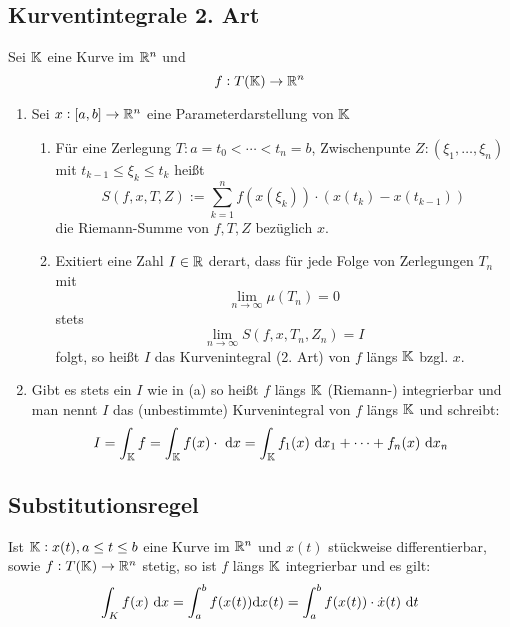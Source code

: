 \subsection{Kurventintegrale 2. Art}
Sei $\mathbb{K}$ eine Kurve im $\mathbb{R}^n$ und
\begin{equation*}
    f: T(\mathbb{K}) \rightarrow \mathbb{R}^n
\end{equation*}
\begin{enumerate}[label= (\alph*)]
    \item Sei $x: [a,b]  \rightarrow \mathbb{R}^n$ eine Parameterdarstellung von $\mathbb{K}$
        \begin{enumerate}[label = (\roman*)]
            \item Für eine Zerlegung $T: a = t_0 < \cdots < t_n = b$,
                Zwischenpunte $Z: (\xi_1, \ldots, \xi_n)$ mit
                $t_{k-1} \leq \xi_k \leq t_k$
                heißt
                \begin{equation*}
                    S(f,x,T,Z) := \sum_{k=1}^n f(x(\xi_k)) \cdot (x(t_k) - x(t_{k-1}))
                \end{equation*}
                die Riemann-Summe von $f, T, Z$ bezüglich $x$.
            \item Exitiert eine Zahl $I \in \mathbb{R}$ derart, dass für jede Folge von
                Zerlegungen $T_n$ mit
                \begin{equation*}
                    \lim_{n \rightarrow \infty} \mu(T_n) = 0
                \end{equation*}
                stets
                \begin{equation*}
                    \lim_{n \rightarrow \infty} S(f,x,T_n, Z_n) = I
                \end{equation*}
                folgt, so heißt $I$ das Kurvenintegral (2. Art) von
                $f$ längs $\mathbb{K}$ bzgl. $x$.
        \end{enumerate}
    \item Gibt es stets ein $I$ wie in (a) so heißt $f$ längs $\mathbb{K}$ (Riemann-)
        integrierbar und man nennt $I$ das (unbestimmte) Kurvenintegral von $f$
        längs $\mathbb{K}$ und schreibt:
        \begin{equation*}
            I = \int_{\mathbb{K}} f = \int_{\mathbb{K}} f(x) \cdot \text{ d}x = \int_{\mathbb{K}} f_1(x) \text{ d}x_1 + \cdots
            + f_n(x) \text{ d}x_n
        \end{equation*}
\end{enumerate}

\subsection{Substitutionsregel}
Ist $\mathbb{K}: x(t), a \leq t \leq b$ eine Kurve im $\mathbb{R}^n$ und $x(t)$ stückweise
differentierbar, sowie $f: T(\mathbb{K}) \rightarrow \mathbb{R}^n$ stetig, so ist $f$ längs
$\mathbb{K}$ integrierbar und es gilt:
\begin{equation*}
    \int_K f(x) \text{ d}x = \int_a^b f(x(t)) \text{d}x(t) = \int_a^b f(x(t)) \cdot
    \dot{x}(t) \text{ d}t
\end{equation*}

